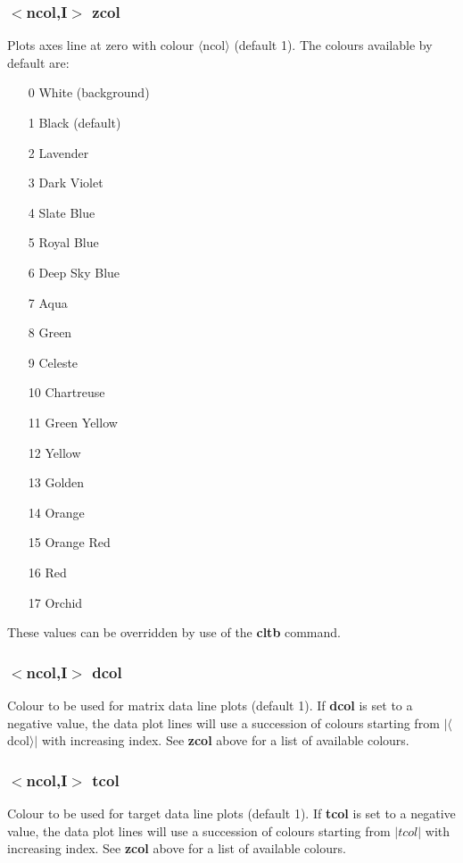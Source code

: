 \documentclass[a4paper,10pt]{report}
\begin{document}
\subsubsection{$<$ncol,{\bf I}$>$ zcol}\label{sec:zcol}
Plots axes line at zero with colour $\langle$ncol$\rangle$ (default 1). The colours available by default are:
\begin{enumerate}
  \item[ 0] White (background)
  \item[ 1] Black (default)
  \item[ 2] Lavender
  \item[ 3] Dark Violet
  \item[ 4] Slate Blue
  \item[ 5] Royal Blue
  \item[ 6] Deep Sky Blue
  \item[ 7] Aqua
  \item[ 8] Green
  \item[ 9] Celeste
  \item[10] Chartreuse
  \item[11] Green Yellow
  \item[12] Yellow
  \item[13] Golden
  \item[14] Orange
  \item[15] Orange Red
  \item[16] Red
  \item[17] Orchid
\end{enumerate}
These values can be overridden by use of the {\bf cltb} command.

\subsubsection{$<$ncol,{\bf I}$>$ dcol}\label{sec:dcol}
Colour to be used for matrix data line plots (default 1).
If {\bf dcol} is set to a negative value, the data plot lines will use
a succession of colours starting from $|\langle$dcol$\rangle|$ with increasing index.
See {\bf zcol} above for a list of available colours.

\subsubsection{$<$ncol,{\bf I}$>$ tcol}\label{sec:tcol}
Colour to be used for target data line plots (default 1).
If {\bf tcol} is set to a negative value, the data plot lines will use
a succession of colours starting from $|tcol|$ with increasing index.
See {\bf zcol} above for a list of available colours.
\end{document}
